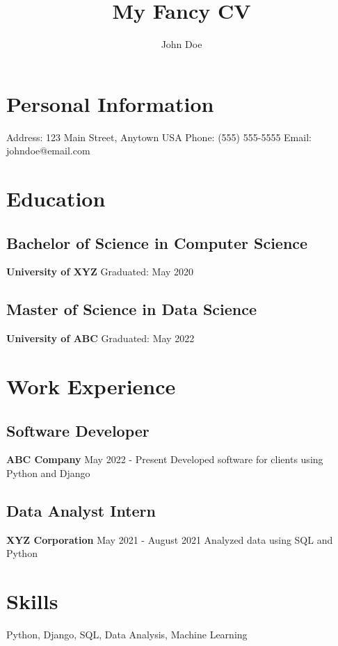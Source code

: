 \documentclass{article}%
\title{My Fancy CV}%
\author{John Doe}%
\date{}%
\begin{document}
%
\normalsize%
\section{Personal Information}%
\label{sec:PersonalInformation}%

%
Address: 123 Main Street, Anytown USA\newline%
%
Phone: (555) 555{-}5555\newline%
%
Email: johndoe@email.com\newline%
%
\section{Education}%
\label{sec:Education}%

%
\subsection{Bachelor of Science in Computer Science}%
\label{subsec:BachelorofScienceinComputerScience}%
\textbf{University of XYZ\newline%
}%
Graduated: May 2020\newline%

%
\subsection{Master of Science in Data Science}%
\label{subsec:MasterofScienceinDataScience}%
\textbf{University of ABC\newline%
}%
Graduated: May 2022\newline%

%
\section{Work Experience}%
\label{sec:WorkExperience}%

%
\subsection{Software Developer}%
\label{subsec:SoftwareDeveloper}%
\textbf{ABC Company\newline%
}%
May 2022 {-} Present\newline%
%
Developed software for clients using Python and Django\newline%

%
\subsection{Data Analyst Intern}%
\label{subsec:DataAnalystIntern}%
\textbf{XYZ Corporation\newline%
}%
May 2021 {-} August 2021\newline%
%
Analyzed data using SQL and Python\newline%

%
\section{Skills}%
\label{sec:Skills}%

%
Python, Django, SQL, Data Analysis, Machine Learning%
\end{document}
